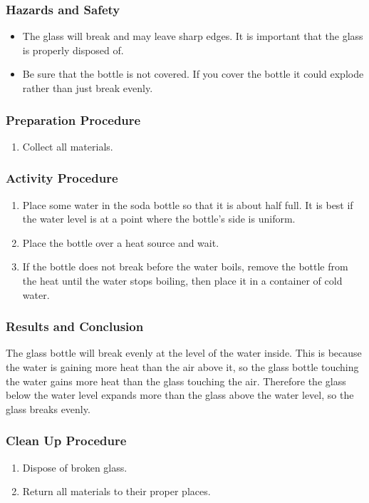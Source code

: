 \subsubsection*{Hazards and Safety}
\begin{itemize}
\item{The glass will break and may leave sharp edges.  It is important that the glass is properly disposed of.}
\item{Be sure that the bottle is not covered.  If you cover the bottle it could explode rather than just break evenly.}
\end{itemize}

\subsubsection*{Preparation Procedure}
\begin{enumerate}
\item{Collect all materials.}
\end{enumerate}

\subsubsection*{Activity Procedure}
\begin{enumerate}
\item{Place some water in the soda bottle so that it is about half full.  It is best if the water level is at a point where the bottle's side is uniform.}
\item{Place the bottle over a heat source and wait.}
\item{If the bottle does not break before the water boils, remove the bottle from the heat until the water stops boiling, then place it in a container of cold water.}
\end{enumerate}

\subsubsection*{Results and Conclusion}
The glass bottle will break evenly at the level of the water inside.  This is because the water is gaining more heat than the air above it, so the glass bottle touching the water gains more heat than the glass touching the air.  Therefore the glass below the water level expands more than the glass above the water level, so the glass breaks evenly.

\subsubsection*{Clean Up Procedure}
\begin{enumerate}
\item{Dispose of broken glass.}
\item{Return all materials to their proper places.}
\end{enumerate}

